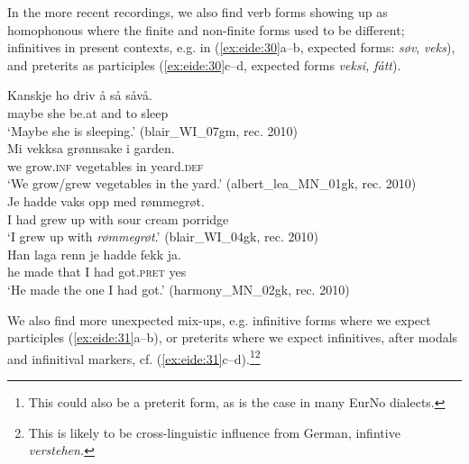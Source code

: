 \documentclass[output=paper]{langscibook}
\begin{document}
In the more recent recordings, we also find verb forms showing up as homophonous where the finite and non-finite forms used to be different; infinitives in present contexts, e.g. in (\ref{ex:eide:30}a--b, expected forms: \textit{søv}, \textit{veks}), and preterits as participles (\ref{ex:eide:30}c--d, expected forms \textit{veksi, fått}).   

\ea%
    \label{ex:eide:30}
    \ea  
    \gll Kanskje ho driv å så såvå.          \\
         maybe she be.at and to sleep          \\
    \glt ‘Maybe she is sleeping.’ (blair\_WI\_07gm, rec. 2010)\\
    \ex  
    \gll Mi vekksa grønnsake i garden.            \\
         we grow.\textsc{inf} vegetables in yeard.\textsc{def}        \\
    \glt ‘We grow/grew vegetables in the yard.’ (albert\_lea\_MN\_01gk, rec. 2010)\\
    \ex  
    \gll Je hadde vaks opp med rømmegrøt.\\
         I had grew up with {sour cream porridge}\\
    \glt ‘I grew up with \textit{rømmegrøt}.’  ({{blair\_WI\_04gk}}, rec. 2010)\\
    \ex  
    \gll Han laga renn je hadde fekk ja.                     \\
         he made that I had got.\textsc{pret} yes        \\
    \glt ‘He made the one I had got.’ (harmony\_MN\_02gk, rec. 2010)\\
    \z %
\z

We also find more unexpected mix-ups, e.g. infinitive forms where we expect participles (\ref{ex:eide:31}a--b), or preterits where we expect infinitives, after modals and infinitival markers, cf. (\ref{ex:eide:31}c--d).\footnote{This could also be a preterit form, as is the case in many EurNo dialects.}\footnote{This is likely to be cross-linguistic influence from German, infintive \textit{verstehen.}}          
\end{document}
